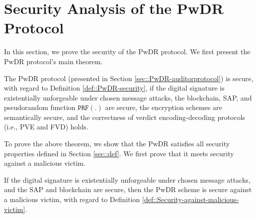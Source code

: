 
\section{Security Analysis of the PwDR Protocol}\label{sec::proof}

In this section, we prove the security of the PwDR protocol. We first present the PwDR protocol's main theorem. 


\begin{theorem}\label{theorem::PwDR-security}
The  PwDR protocol (presented in Section \ref{sec::PwDR-auditorprotocol}) is secure, with regard to Definition \ref{def::PwDR-security}, if the digital signature is existentially unforgeable under chosen message attacks,  the blockchain, SAP, and pseudorandom function $\mathtt{PRF}(.)$ are secure,  the encryption schemes are semantically secure, and the correctness of verdict encoding-decoding protocols (i.e., PVE and FVD) holds. 
\end{theorem}






To prove the above theorem, we show that the PwDR satisfies all security properties defined in Section \ref{sec::def}. We first prove that it meets security against a malicious victim. 


\begin{lemma}\label{lemma::secure-against-a-malicious-victim} If the digital signature is existentially unforgeable under chosen message attacks, and the SAP and blockchain are secure, then the PwDR scheme is secure against a malicious victim, with regard to Definition \ref{def::Security-against-malicious-victim}. 
\end{lemma}

